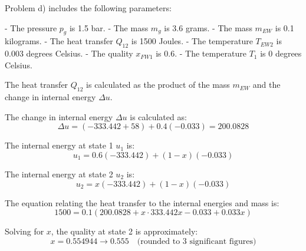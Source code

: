 Problem d) includes the following parameters:

- The pressure \( p_g \) is 1.5 bar.
- The mass \( m_g \) is 3.6 grams.
- The mass \( m_{EW} \) is 0.1 kilograms.
- The heat transfer \( Q_{12} \) is 1500 Joules.
- The temperature \( T_{EW2} \) is 0.003 degrees Celsius.
- The quality \( x_{FW1} \) is 0.6.
- The temperature \( T_1 \) is 0 degrees Celsius.

The heat transfer \( Q_{12} \) is calculated as the product of the mass \( m_{EW} \) and the change in internal energy \( \Delta u \).

The change in internal energy \( \Delta u \) is calculated as:
\[
\Delta u = \left( -333.442 + 58 \right) + 0.4 \left( -0.033 \right) = 200.0828
\]

The internal energy at state 1 \( u_1 \) is:
\[
u_1 = 0.6 \left( -333.442 \right) + (1 - x) \left( -0.033 \right)
\]

The internal energy at state 2 \( u_2 \) is:
\[
u_2 = x \left( -333.442 \right) + (1 - x) \left( -0.033 \right)
\]

The equation relating the heat transfer to the internal energies and mass is:
\[
1500 = 0.1 \left( 200.0828 + x \cdot 333.442 x - 0.033 + 0.033 x \right)
\]

Solving for \( x \), the quality at state 2 is approximately:
\[
x = 0.554944 \rightarrow 0.555 \quad \text{(rounded to 3 significant figures)}
\]